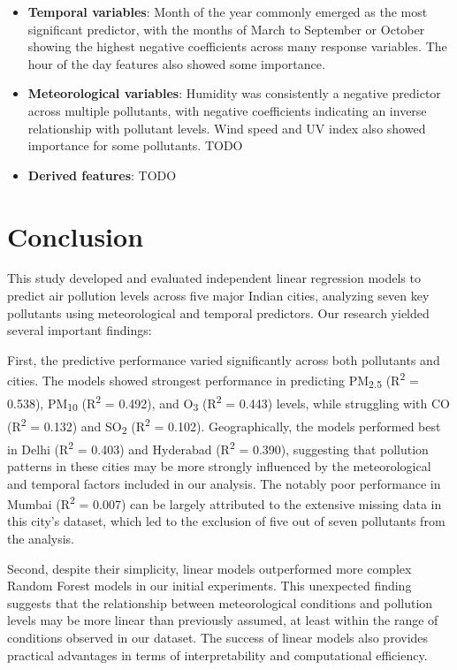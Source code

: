 \documentclass[twoside,11pt]{article}
\begin{document}
\begin{itemize}
  \item \textbf{Temporal variables}: Month of the year commonly emerged as the most significant predictor, with the months of March to September or October showing the highest negative coefficients across many response variables. The hour of the day features also showed some importance.
  \item \textbf{Meteorological variables}: Humidity was consistently a negative predictor across multiple pollutants, with negative coefficients indicating an inverse relationship with pollutant levels. Wind speed and UV index also showed importance for some pollutants. TODO
  \item \textbf{Derived features}: TODO
\end{itemize}

\section{Conclusion}

This study developed and evaluated independent linear regression models to predict air pollution levels across five major Indian cities, analyzing seven key pollutants using meteorological and temporal predictors. Our research yielded several important findings:

First, the predictive performance varied significantly across both pollutants and cities. The models showed strongest performance in predicting PM\textsubscript{2.5} (R\textsuperscript{2} = 0.538), PM\textsubscript{10} (R\textsuperscript{2} = 0.492), and O\textsubscript{3} (R\textsuperscript{2} = 0.443) levels, while struggling with CO (R\textsuperscript{2} = 0.132) and SO\textsubscript{2} (R\textsuperscript{2} = 0.102). Geographically, the models performed best in Delhi (R\textsuperscript{2} = 0.403) and Hyderabad (R\textsuperscript{2} = 0.390), suggesting that pollution patterns in these cities may be more strongly influenced by the meteorological and temporal factors included in our analysis. The notably poor performance in Mumbai (R\textsuperscript{2} = 0.007) can be largely attributed to the extensive missing data in this city's dataset, which led to the exclusion of five out of seven pollutants from the analysis.

Second, despite their simplicity, linear models outperformed more complex Random Forest models in our initial experiments. This unexpected finding suggests that the relationship between meteorological conditions and pollution levels may be more linear than previously assumed, at least within the range of conditions observed in our dataset. The success of linear models also provides practical advantages in terms of interpretability and computational efficiency.
\end{document}
